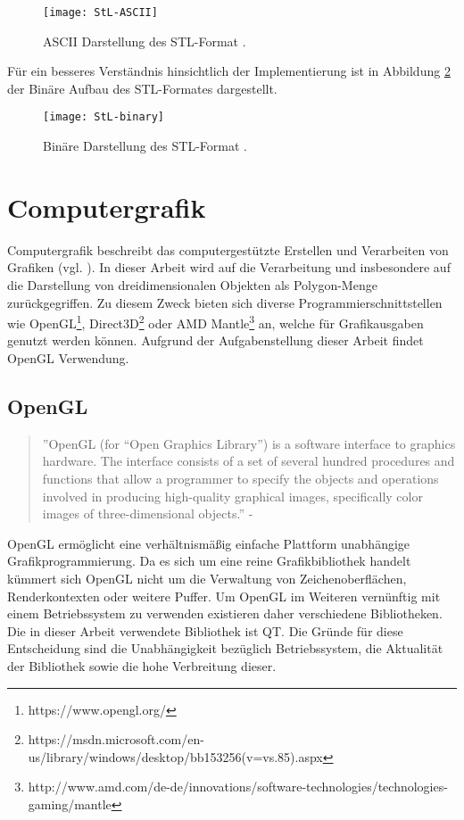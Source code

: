 \begin{figure}[H]
	\centering
	\texttt{[image: StL-ASCII]}
	\caption{ASCII Darstellung des STL-Format \citep{STLFormat}.}
	\label{fig:ASCIISTL}
\end{figure}
\noindent Für ein besseres Verständnis hinsichtlich der Implementierung ist in Abbildung \ref{fig:BINARYSTL} der Binäre Aufbau des STL-Formates dargestellt. 
\begin{figure}[H]
	\centering
	\texttt{[image: StL-binary]}
	\caption{Binäre Darstellung des STL-Format \citep{STLFormat}.}
	\label{fig:BINARYSTL}
\end{figure}

\section{Computergrafik}
Computergrafik beschreibt das computergestützte Erstellen und Verarbeiten von Grafiken (vgl. \citep{ComputerGraphics}). In dieser Arbeit wird auf die Verarbeitung und insbesondere auf die Darstellung von dreidimensionalen Objekten als Polygon-Menge zurückgegriffen. Zu diesem Zweck bieten sich diverse Programmierschnittstellen wie OpenGL\footnote{https://www.opengl.org/}, Direct3D\footnote{https://msdn.microsoft.com/en-us/library/windows/desktop/bb153256(v=vs.85).aspx} oder AMD Mantle\footnote{http://www.amd.com/de-de/innovations/software-technologies/technologies-gaming/mantle} an, welche für Grafikausgaben genutzt werden können. Aufgrund der Aufgabenstellung dieser Arbeit findet OpenGL Verwendung.
\subsection{OpenGL}
\begin{quote}
	''OpenGL (for “Open Graphics Library”) is a software interface to graphics hardware.
	The interface consists of a set of several hundred procedures and functions
	that allow a programmer to specify the objects and operations involved in producing
	high-quality graphical images, specifically color images of three-dimensional
	objects.'' - \citep{OpenGLDoku}
\end{quote}
OpenGL ermöglicht eine verhältnismäßig einfache Plattform unabhängige Grafikprogrammierung. Da es sich um eine reine Grafikbibliothek handelt kümmert sich OpenGL nicht um die Verwaltung von Zeichenoberflächen, Renderkontexten oder weitere Puffer. Um OpenGL im Weiteren vernünftig mit einem Betriebssystem zu verwenden existieren daher verschiedene Bibliotheken. Die in dieser Arbeit verwendete Bibliothek ist QT. Die Gründe für diese Entscheidung sind die Unabhängigkeit bezüglich Betriebssystem, die Aktualität der Bibliothek sowie die hohe Verbreitung dieser.